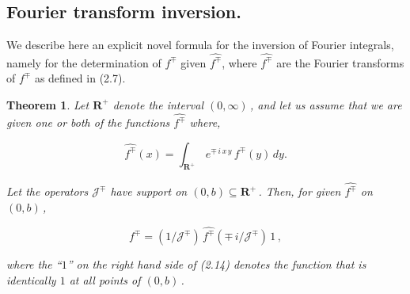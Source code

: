 \documentclass[11pt]{article}
\newtheorem{Theorem}{Theorem}[section]
\begin{document}
 \subsection{Fourier transform inversion.} %
 
We describe here an explicit novel formula for the inversion of 
Fourier integrals, namely for the determination of $f^\mp$
given $\widehat{f^\mp}$, where $\widehat{f^\mp}$ are the Fourier
transforms of $f^\mp$ as defined in (2.7).  
 
\newpage
\begin{Theorem}%
  \label{theorem:2.6}
   Let ${\mathbf R}^+$ denote the interval $(0,\infty)$\,, and let us
   assume that we are given one or both of the functions
   $\widehat{f^\mp}$ where,

   \begin{equation}%
        \widehat{f^\mp}(x) = \displaystyle \int_{{\mathbf R}^+} \,
        e^{\mp\,i\,x\,y} \, f^\mp(y)\,dy.
     \label{equation:2.13}
   \end{equation}

   \noindent Let the operators ${\mathcal J}^\mp$ have support on
   $(0,b) \subseteq {\mathbf R}^+$\,.  Then, for given
   $\widehat{f^\mp}$ on $(0,b)$\,,

    \begin{equation}%
        f^\mp = \displaystyle \left(1/{\mathcal
          J}^\mp\right)\,\widehat{f^\mp}\left(\mp\,i/{\mathcal
          J}^\mp\right)\,1\,,
      \label{equation:2.14}
    \end{equation}

    \noindent where the ``$1$'' on the right hand side of (2.14) denotes the
    function that is identically $1$ at all points of $(0,b)$\,.

 \end{Theorem}
\end{document}
